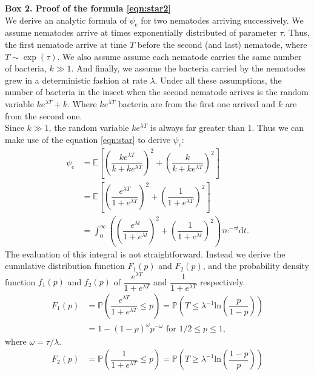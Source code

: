 \documentclass[10pt]{article}
\newcommand{\ud}{{\mathrm{d}}}
\newcommand{\pr}{{\mathbb{P}}}
\newcommand{\psic}{\psi_\mathrm{c}}
\begin{document}
\begin{boxframe}
\label{box_psi_consecutive}
\begin{multicols}{2}
\textbf{Box 2. Proof of  the formula \eqref{eqn:star2}\\}
We derive an analytic formula of $\psic$ for two nematodes arriving successively. We assume nematodes arrive at times exponentially distributed of parameter $ \tau$. Thus, the first nematode arrive at time $T$ before the second (and last) nematode, where $T\sim \exp ( \tau)$. We also assume assume each nematode carries the same number of bacteria, $k \gg 1$. And finally, we assume the bacteria carried by the nematodes grew in a deterministic fashion at rate $\lambda$. Under all these assumptions, the number of bacteria in the insect when the second nematode arrives is the random variable $k e^{\lambda  T}+k$. Where $k e^{\lambda  T}$ bacteria are from the first one arrived and $k$ are from the second one.\\ 
  Since $k \gg 1$, the random variable $k e^{\lambda  T} $ is always far greater than $1$. Thus we can make use of the equation \eqref{eqn:star} to derive $\psic$:
  \begin{align}
  \psic  &=\mathbb{E} \left[ \left( \dfrac{ k e^{\lambda T}}{k+ke^{\lambda T}} \right)^2+\left( \dfrac{k}{k+ke^{\lambda T}} \right)^2 \right] \\
  &=\mathbb{E} \left[ \left( \dfrac{ e^{\lambda T}}{1+e^{\lambda T}} \right)^2+\left( \dfrac{1}{1+e^{\lambda T}} \right)^2 \right] \\
  &=\int_0^\infty \left( \left( \dfrac{ e^{\lambda t}}{1+e^{\lambda t}} \right)^2 + \left( \dfrac{1}{1+e^{\lambda t}} \right)^2 \right) \tau e^{ -\tau t } \ud t.
  \end{align}
  The evaluation of this integral is not straightforward. Instead we derive the cumulative distribution function $F_1(p)$ and $F_2(p)$, and the probability density function $f_1(p)$ and $f_2(p)$ of $\dfrac{ e^{\lambda T}}{1+e^{\lambda T}}$ and $\dfrac{ 1}{1+e^{\lambda T}}$ respectively.
  \begin{align}
  F_1(p) &= \pr \left(\dfrac{e^{\lambda T}}{1+e^{\lambda T}} \leq p\right)= \pr \left(T \leq \lambda^{-1} \mathrm{ln}\left( \dfrac{p}{1-p} \right) \right) \nonumber \\
  &= 1-(1-p)^{\omega} p^{-\omega} \text{ for } 1/2 \leq p \leq 1,
  \end{align} 
  where $\omega=\tau / \lambda$.
  \begin{align}
  F_2(p) &= \pr \left(\dfrac{1}{1+e^{\lambda T}} \leq p\right) = \pr \left(T \geq \lambda^{-1} \mathrm{ln}\left( \dfrac{1-p}{p} \right) \right) \nonumber \\

\end{align}
\end{multicols}
\end{boxframe}
\end{document}
